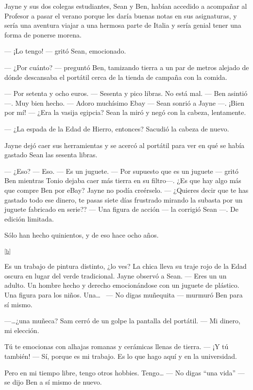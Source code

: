 Jayne y sus dos colegas estudiantes, Sean y Ben, habían accedido a
acompañar al Profesor a pasar el verano porque les daría buenas notas en
sus asignaturas, y sería una aventura viajar a una hermosa parte de
Italia y sería genial tener una forma de ponerse morena.

--- ¡Lo tengo! --- gritó Sean, emocionado.

--- ¿Por cuánto? --- preguntó Ben, tamizando tierra a un par de metros
alejado de dónde descansaba el portátil cerca de la tienda de campaña
con la comida.

--- Por setenta y ocho euros. --- Sesenta y pico libras. No está mal.
--- Ben asintió ---. Muy bien hecho. --- Adoro muchísimo Ebay --- Sean
sonrió a Jayne ---. ¡Bien por mí! --- ¿Era la vasija egipcia? Sean la
miró y negó con la cabeza, lentamente.

--- ¿La espada de la Edad de Hierro, entonces? Sacudió la cabeza de
nuevo.

Jayne dejó caer sus herramientas y se acercó al portátil para ver en qué
se había gastado Sean las sesenta libras.

--- ¿Eso? --- Eso. --- Es un juguete. --- Por supuesto que es un juguete
--- gritó Ben mientras Tonio dejaba caer más tierra en su filtro---. ¿Es
que hay algo más que compre Ben por eBay? Jayne no podía creérselo. ---
¿Quieres decir que te has gastado todo ese dinero, te pasas siete días
frustrado mirando la subasta por un juguete fabricado en serie?? --- Una
figura de acción --- la corrigió Sean ---. De edición limitada.

Sólo han hecho quinientos, y de eso hace ocho años.

\textsuperscript{\hyperref[cmnt2]{{[}b{]}}}

Es un trabajo de pintura distinto, ¿lo ves? La chica lleva su traje rojo
de la Edad oscura en lugar del verde tradicional. Jayne observó a Sean.
--- Eres un un adulto. Un hombre hecho y derecho emocionándose con un
juguete de plástico. Una figura para los niños. Una\ldots{}~ --- No
digas muñequita --- murmuró Ben para sí mismo.

---\ldots{}¿una muñeca? Sam cerró de un golpe la pantalla del portátil.
--- Mi dinero, mi elección.

Tú te emocionas con alhajas romanas y cerámicas llenas de tierra. --- ¡Y
tú también! --- Sí, porque es mi trabajo. Es lo que hago aquí y en la
universidad.

Pero en mi tiempo libre, tengo otros hobbies. Tengo\ldots{} --- No digas
``una vida'' --- se dijo Ben a sí mismo de nuevo.

